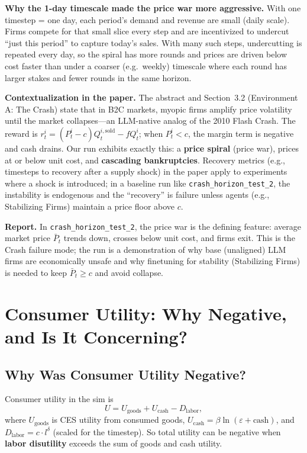 \documentclass{article}
\begin{document}
\textbf{Why the 1-day timescale made the price war more aggressive.} With one timestep = one day, each period's demand and revenue are small (daily scale). Firms compete for that small slice every step and are incentivized to undercut ``just this period'' to capture today's sales. With many such steps, undercutting is repeated every day, so the spiral has more rounds and prices are driven below cost faster than under a coarser (e.g.\ weekly) timescale where each round has larger stakes and fewer rounds in the same horizon.

\textbf{Contextualization in the paper.} The abstract and Section~3.2 (Environment A: The Crash) state that in B2C markets, myopic firms amplify price volatility until the market collapses---an LLM-native analog of the 2010 Flash Crash. The reward is \(r_t^i = (P_t^i - c) Q_t^{i,\text{sold}} - f Q_t^i\); when \(P_t^i < c\), the margin term is negative and cash drains. Our run exhibits exactly this: a \textbf{price spiral} (price war), prices at or below unit cost, and \textbf{cascading bankruptcies}. Recovery metrics (e.g., timesteps to recovery after a supply shock) in the paper apply to experiments where a shock is introduced; in a baseline run like \texttt{crash\_horizon\_test\_2}, the instability is endogenous and the ``recovery'' is failure unless agents (e.g., Stabilizing Firms) maintain a price floor above \(c\).

\textbf{Report.} In \texttt{crash\_horizon\_test\_2}, the price war is the defining feature: average market price \(\bar{P}_t\) trends down, crosses below unit cost, and firms exit. This is the Crash failure mode; the run is a demonstration of why base (unaligned) LLM firms are economically unsafe and why finetuning for stability (Stabilizing Firms) is needed to keep \(\bar{P}_t \geq c\) and avoid collapse.

\section{Consumer Utility: Why Negative, and Is It Concerning?}

\subsection{Why Was Consumer Utility Negative?}

Consumer utility in the sim is
\[
U = U_{\text{goods}} + U_{\text{cash}} - D_{\text{labor}},
\]
where \(U_{\text{goods}}\) is CES utility from consumed goods, \(U_{\text{cash}} = \beta \ln(\varepsilon + \text{cash})\), and \(D_{\text{labor}} = c \cdot l^\delta\) (scaled for the timestep). So total utility can be negative when \textbf{labor disutility} exceeds the sum of goods and cash utility.
\end{document}
